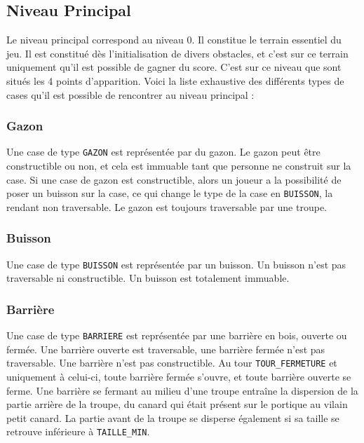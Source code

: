 
\subsection{Niveau Principal}

Le niveau principal correspond au niveau 0.
Il constitue le terrain essentiel du jeu.
Il est constitué dès l'initialisation de divers obstacles, et c'est sur ce terrain
uniquement qu'il est possible de gagner du score.
C'est sur ce niveau que sont situés les 4 points d'apparition.
Voici la liste exhaustive des différents types de cases qu'il est possible de
rencontrer au niveau principal :

\subsubsection{Gazon} 

Une case de type \texttt{GAZON} est représentée par du gazon.
%
Le gazon peut être constructible ou non, et cela est immuable tant que
personne ne construit sur la case.
Si une case de gazon est constructible, alors un joueur a la possibilité de poser un
buisson sur la case, ce qui change le type de la case en \texttt{BUISSON},
la rendant non traversable.
Le gazon est toujours traversable par une troupe.
%

\subsubsection{Buisson} 

Une case de type \texttt{BUISSON} est représentée par un buisson.
%
Un buisson n'est pas traversable ni constructible.
Un buisson est totalement immuable.

\subsubsection{Barrière}
\label{sec:barriere}

Une case de type \texttt{BARRIERE} est représentée par une barrière en bois,
ouverte ou fermée.
%
Une barrière ouverte est traversable, une barrière fermée n'est pas traversable.
Une barrière n'est pas constructible.
%
Au tour \texttt{TOUR\_FERMETURE} et uniquement à celui-ci, toute barrière fermée s'ouvre,
et toute barrière ouverte se ferme.
Une barrière se fermant au milieu d'une troupe entraîne la dispersion de la partie 
arrière de la troupe, du canard qui était présent sur le portique au vilain petit canard.
La partie avant de la troupe se disperse également si sa taille se retrouve
inférieure à \texttt{TAILLE\_MIN}.

